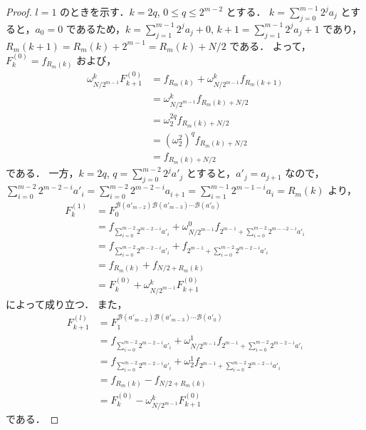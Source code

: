 \documentclass[twocolumn, uplatex, dvipdfmx]{jsarticle}
\renewcommand{\le}{\leqslant}
\numberwithin{equation}{section}
\theoremstyle{definition}
\begin{document}
\begin{proof}
	$l=1$ のときを示す．$k=2q$, $0\le q\le 2^{m-2}$ とする．
	$k=\sum_{j=0}^{m-1}2^ja_j$ とすると，$a_0=0$ であるため，$k=\sum_{j=1}^{m-1}2^ja_j+0$, $k+1=\sum_{j=1}^{m-1}2^ja_j+1$ であり，$R_m(k+1)=R_m(k)+2^{m-1}=R_m(k)+N/2$ である．
	よって，$F_k^{(0)}=f_{R_m(k)}$ および，
	\begin{align*}
		\omega_{N/2^{m-1}}^kF_{k+1}^{(0)}&=f_{R_m(k)}+\omega_{N/2^{m-1}}^kf_{R_m(k+1)}\\
		&=\omega_{N/2^{m-1}}^kf_{R_m(k)+N/2}\\
		&=\omega_2^{2q}f_{R_m(k)+N/2}\\
		&=(\omega_2^2)^qf_{R_m(k)+N/2}\\
		&=f_{R_m(k)+N/2}
	\end{align*}
	である．
	一方，$k=2q$, $q=\sum_{j=0}^{m-2}2^ja'_j$ とすると，$a'_j=a_{j+1}$ なので，$\sum_{i=0}^{m-2}2^{m-2-i}a'_i=\sum_{i=0}^{m-2}2^{m-2-i}a_{i+1}=\sum_{i=1}^{m-1}2^{m-1-i}a_i=R_m(k)$ より，
	\begin{align*}
		F_k^{(1)}&=F_0^{\mathcal{B}(a'_{m-2})\mathcal{B}(a'_{m-3})\cdots\mathcal{B}(a'_0)}\\
		&=f_{\sum_{i=0}^{m-2}2^{m-2-i}a'_i}+\omega_{N/2^{m-1}}^0f_{2^{m-1}+\sum_{i=0}^{m-2}2^{m--2-i}a'_i}\\
		&=f_{\sum_{i=0}^{m-2}2^{m-2-i}a'_i}+f_{2^{m-1}+\sum_{i=0}^{m-2}2^{m-2-i}a'_i}\\
		&=f_{R_m(k)}+f_{N/2+R_m(k)}\\
		&=F_k^{(0)}+\omega_{N/2^{m-1}}^kF_{k+1}^{(0)}
	\end{align*}
	によって成り立つ．
	また，
	\begin{align*}
		F_{k+1}^{(l)}&=F_1^{\mathcal{B}(a'_{m-2})\mathcal{B}(a'_{m-3})\cdots\mathcal{B}(a'_0)}\\
		&=f_{\sum_{i=0}^{m-2}2^{m-2-i}a'_i}+\omega_{N/2^{m-1}}^1f_{2^{m-1}+\sum_{i=0}^{m-2}2^{m-2-i}a'_i}\\
		&=f_{\sum_{i=0}^{m-2}2^{m-2-i}a'_i}+\omega_2^1f_{2^{m-1}+\sum_{i=0}^{m-2}2^{m-2-i}a'_i}\\
		&=f_{R_m(k)}-f_{N/2+R_m(k)}\\
		&=F_k^{(0)}-\omega_{N/2^{m-1}}^kF_{k+1}^{(0)}
	\end{align*}
	である．


\end{proof}
\end{document}
